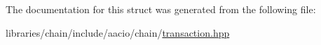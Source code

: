 The documentation for this struct was generated from the following file\+:\begin{DoxyCompactItemize}
\item 
libraries/chain/include/aacio/chain/\mbox{\hyperlink{libraries_2chain_2include_2aacio_2chain_2transaction_8hpp}{transaction.\+hpp}}\end{DoxyCompactItemize}
